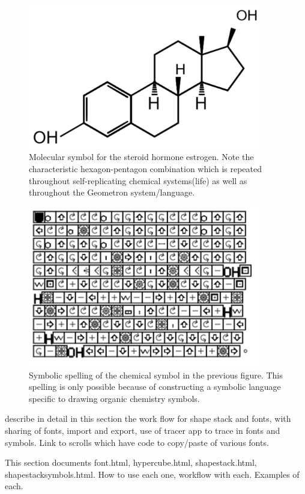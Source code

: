 \begin{figure}
	\centering
	\includegraphics[width=4in]{figures/shapes/estrogendiagram.png}
	\caption[estrogendiagram]
	{Molecular symbol for the steroid hormone estrogen.  Note the characteristic hexagon-pentagon combination which is repeated throughout self-replicating chemical systems(life) as well as throughout the Geometron system/language.}
\end{figure}

\begin{figure}
	\centering
	\includegraphics[width=4in]{figures/shapes/estrogenspelling.png}
	\caption[estrogenspelling]
	{Symbolic spelling of the chemical symbol in the previous figure.  This spelling is only possible because of constructing a symbolic language specific to drawing organic chemistry symbols.}
\end{figure}

describe in detail in this section the work flow for shape stack and fonts, with sharing of fonts, import and export, use of tracer app to trace in fonts and symbols.  Link to scrolls which have code to copy/paste of various fonts.  

This section documents font.html, hypercube.html, shapestack.html, shapestacksymbols.html.  How to use each one, workflow with each.  Examples of each.  

